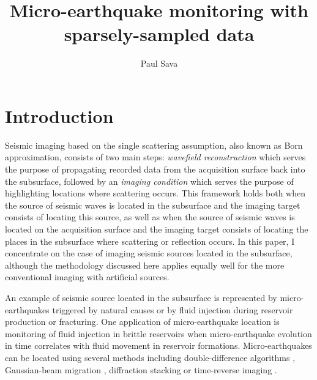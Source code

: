 


\def\xh{ {{\x}_h} }
\def\yh{ {{\y}_h} }
\def\th{ {{\t}_h} }

\def\geosout#1{}
\def\geouline#1{#1}


\author{Paul Sava}
\title{Micro-earthquake monitoring with sparsely-sampled data}
\maketitle



\section{Introduction}

Seismic imaging based on the single scattering assumption, also known
as Born approximation, consists of two main steps: \textit{wavefield
  reconstruction} which serves the purpose of propagating recorded
data from the acquisition surface back into the subsurface, followed
by an \textit{imaging condition} which serves the purpose of
highlighting locations where scattering occurs.
%
This framework holds both when the source of seismic waves is located
in the subsurface and the imaging target consists of locating this
source, as well as when the source of seismic waves is located on the
acquisition surface and the imaging target consists of locating the
places in the subsurface where scattering or reflection occurs. In
this paper, I concentrate on the case of imaging seismic sources
located in the subsurface, although the methodology discussed here
applies equally well for the more conventional imaging with artificial
sources.

An example of seismic source located in the subsurface is represented
by micro-earthquakes triggered by natural causes or by fluid injection
during reservoir production or fracturing. One application of
micro-earthquake location is monitoring of fluid injection in brittle
reservoirs when micro-earthquake evolution in time correlates with
fluid movement in reservoir formations.  Micro-earthquakes can be
located using several methods including double-difference algorithms
\cite[]{WaldhauserEllsworth:2000}, Gaussian-beam migration
\cite[]{SEG-2004-03540357,rentsch:S33}, diffraction stacking
\cite[]{Gajewski:2007} or \geosout{reverse-time migration}
\geouline{time-reverse imaging} \cite[]{Gajewski:2005,Artman.meq}.

